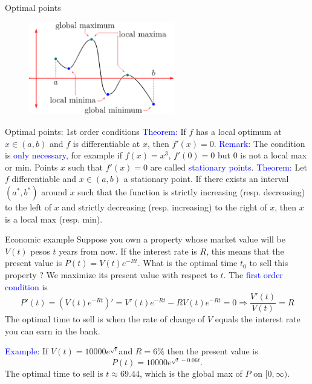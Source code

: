 \documentclass[11pt,aspectratio=169]{beamer}
\begin{document}
\begin{frame}{Optimal points}
\begin{figure}
\includegraphics[width=2.5in]{img/max_min} 
\end{figure}
\end{frame}

\begin{frame}{Optimal points: 1st order conditions}
 \textcolor{blue}{Theorem:} If $f$ has a local optimum at $x \in (a,b)$ and $f$ is differentiable at $x$, then $f'(x)=0$.
\vskip 12pt
\textcolor{blue}{Remark:} The condition is \textcolor{blue}{only necessary}, for example if $f(x)=x^3$, $f'(0)=0$ but $0$ is not a local max or min.
\vskip 12pt
Points $x$ such that $f'(x)=0$ are called \textcolor{blue}{stationary points}.
\vskip 12pt
\textcolor{blue}{Theorem:} Let $f$ differentiable and $x \in (a,b)$ a stationary point. If there exists an interval $(a^{\ast}, b^{\ast})$ around $x$ such that the function is strictly increasing (resp. decreasing) to the left of $x$ and strictly decreasing (resp. increasing) to the right of $x$, then $x$ is a local max (resp. min).
\end{frame}


\begin{frame}{Economic example}
Suppose you own a property whose market value will be $V(t)$ pesos $t$ years from now. If the interest rate is $R$, this means that the present value is $P(t)=V(t) e^{-Rt}$.
What is the optimal time $t_0$ to sell this property ? We maximize its present value with respect  to $t$.
\vskip 12pt
The \textcolor{blue}{first order condition} is
$$
P'(t)=(V(t) e^{-Rt})'=V'(t) e^{-Rt}-RV(t) e^{-Rt}=0 \Rightarrow \frac{V'(t)}{V(t)}=R
$$ 
The optimal time to sell is when the rate of change of $V$ equals the interest rate you can earn in the bank.
\vskip 12pt

 \textcolor{blue}{Example}: If $V(t)=10000e^{\sqrt{t}}$and $R=6\%$ then the present value is 
$$
P(t)=10000e^{\sqrt{t}-0.06 t}.
$$
The optimal time to sell is $t \approx 69.44$, which is the global max of $P$ on $[0, \infty)$.


\end{frame}
\end{document}
